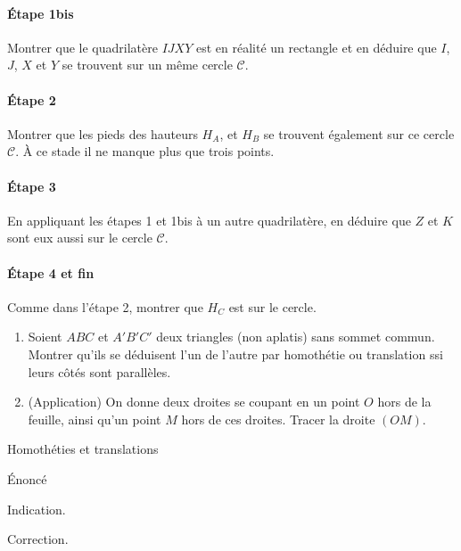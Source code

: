 \begin{exo}
\paragraph{Étape 1bis}
Montrer que le quadrilatère $IJXY$ est en réalité un rectangle et en déduire que $I$, $J$, $X$ et $Y$ se trouvent sur un même cercle $\mathcal C$.
\paragraph{Étape 2}
Montrer que les pieds des hauteurs $H_A$, et $H_B$ se trouvent également sur ce cercle $\mathcal C$. À ce stade il ne manque plus que trois points.
\paragraph{Étape 3}
En appliquant les étapes 1 et 1bis à un autre quadrilatère, en déduire que $Z$ et $K$ sont eux aussi sur le cercle $\mathcal C$.
\paragraph{Étape 4 et fin}
Comme dans l'étape 2, montrer que $H_C$ est sur le cercle.
\end{exo}



\begin{exo}
\begin{enumerate}
\item Soient $ABC$ et $A'B'C'$ deux triangles (non aplatis) sans sommet commun. Montrer qu'ils se déduisent l'un de l'autre par homothétie ou translation ssi leurs côtés sont parallèles.
\item (Application) On donne deux droites se coupant en un point $O$ hors de la feuille, ainsi qu'un point $M$ hors de ces droites. Tracer la droite $(OM)$.
\end{enumerate}
\begin{hint}   
Homothéties et translations
\end{hint}
\end{exo}  








\begin{exo}
Énoncé
\begin{hint}
Indication.
\end{hint}
\begin{sol}
Correction.
\end{sol}
\end{exo}

